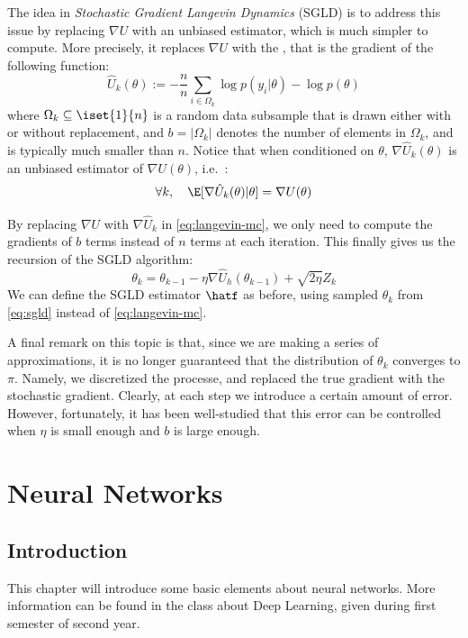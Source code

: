 \documentclass[toc, titlepaged]{../cs-classes/cs-classes}
\begin{document}
The idea in \emph{Stochastic Gradient Langevin Dynamics} (SGLD) is to address this issue by replacing $\nabla U$ with an unbiased estimator, which is much simpler to compute. More precisely, it replaces $\nabla U$ with the , that is the gradient of the following function:
\begin{equation}
    \hat{U}_k(\theta) := -\frac{n}{n}\sum_{i\in\Omega_k}\log p(y_i|\theta)-\log p(\theta)
\end{equation}
where $\Omega_k\subseteq\iset{1}{n}$ is a random data subsample that is drawn either with or without replacement, and $b=|\Omega_k|$ denotes the number of elements in $\Omega_k$, and is typically much smaller than $n$. Notice that when conditioned on $\theta$, $\nabla \hat{U}_k(\theta)$ is an unbiased estimator of $\nabla U(\theta)$, i.e.~:
\begin{equation*}
    \forall k, \quad \E[\nabla \hat{U}_k(\theta)|\theta] = \nabla U(\theta)
\end{equation*}

By replacing $\nabla U$ with $\nabla \hat{U}_k$ in \eqref{eq:langevin-mc}, we only need to compute the gradients of $b$ terms instead of $n$ terms at each iteration. This finally gives us the recursion of the SGLD algorithm:
\begin{equation}
    \label{eq:sgld}
    \theta_k = \theta_{k-1}-\eta\nabla\hat{U}_h(\theta_{k-1})+\sqrt{2\eta}Z_k
\end{equation}
We can define the SGLD estimator $\hatf$ as before, using sampled $\theta_k$ from \eqref{eq:sgld} instead of \eqref{eq:langevin-mc}.

A final remark on this topic is that, since we are making a series of approximations, it is no longer guaranteed that the distribution of $\theta_k$ converges to $\pi$. Namely, we discretized the processe, and replaced the true gradient with the stochastic gradient. Clearly, at each step we introduce a certain amount of error. However, fortunately, it has been well-studied that this error can be controlled when $\eta$ is small enough and $b$ is large enough.

\section{Neural Networks}
\subsection{Introduction}
This chapter will introduce some basic elements about neural networks. More information can be found in the class about Deep Learning, given during first semester of second year.
\end{document}
